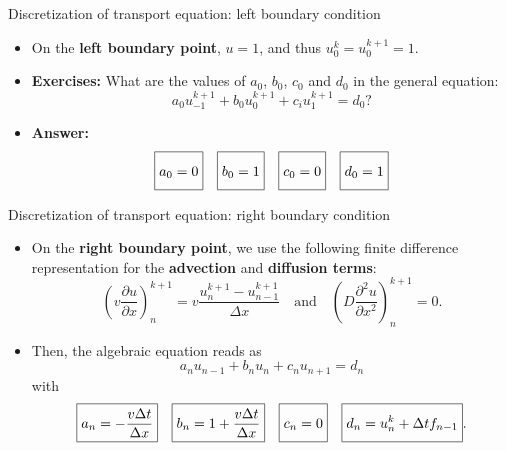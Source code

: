 %
%
\begin{frame}{Discretization of transport equation: left boundary condition}
\begin{itemize}
\item On the \alert{\bf left boundary point}, $u=1$, and thus $u^{k}_{0}=u^{k+1}_{0} =1.$ 
\item \textbf{Exercises: }What are the values of $a_{0}$, $b_{0}$, $c_{0}$
and $d_{0}$ in the general equation:
\[
a_{0}u_{-1}^{k+1}+b_{0}u_{0}^{k+1}+c_{i}u_{1}^{k+1}=d_{0}?
\]
\hiddenpause
\item \textbf{Answer:} 
\[
\boxed{a_{0}=0\vphantom{\frac{D\Delta t}{\Delta x^{2}}}}\quad\boxed{b_{0}=1\vphantom{\frac{D\Delta t}{\Delta x^{2}}}}\quad\boxed{c_{0}=0\vphantom{\frac{D\Delta t}{\Delta x^{2}}}}\quad\boxed{d_{0}=1\vphantom{\frac{D\Delta t}{\Delta x^{2}}}}
\]
\end{itemize}
\end{frame}
%
%
\begin{frame}{Discretization of transport equation: right boundary condition}

\begin{itemize}
\item On the \alert{\bf right boundary point}, we use the following finite difference representation for the \textbf{advection} and  \textbf{diffusion terms}:
\[
\left(v\frac{\partial u}{\partial x}\right)_{n}^{k+1}=v\frac{u_{n}^{k+1}-u_{n-1}^{k+1}}{\Delta x} 
\quad \mbox{and} \quad
\left(D\frac{\partial^{2}u}{\partial x^{2}}\right)_{n}^{k+1}=0.
\]
\item Then, the algebraic equation reads as
\[
a_{n}u_{n-1} + b_{n}u_{n} + c_{n}u_{n+1} =d_{n}
\]
with
\[
\boxed{a_{n}=-\frac{v\Delta t}{\Delta x}}\quad\boxed{b_{n}=1+\frac{v\Delta t}{\Delta x}}\quad\boxed{c_{n}=0\vphantom{\frac{D\Delta t}{\Delta x^{2}}}}\quad\boxed{d_{n}=u_{n}^{k}+\Delta tf_{n-1}\vphantom{\frac{D\Delta t}{\Delta x^{2}}}}.
\]
\end{itemize}
\end{frame}
